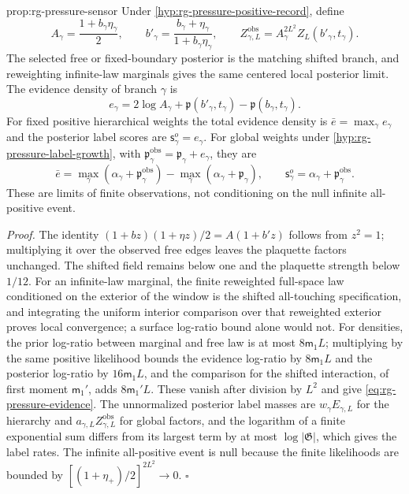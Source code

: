 {prop:rg-pressure-sensor}
Under \cref{hyp:rg-pressure-positive-record}, define
\begin{equation}
 A_\gamma=\frac{1+b_\gamma\eta_\gamma}{2},\qquad
 b'_\gamma=\frac{b_\gamma+\eta_\gamma}{1+b_\gamma\eta_\gamma},\qquad
 Z^{\mathrm{obs}}_{\gamma,L}
 =A_\gamma^{2L^2}Z_L(b'_\gamma,t_\gamma).
 \label{eq:rg-pressure-sensor}
\end{equation}
The selected free or fixed-boundary posterior is the matching shifted branch,
and reweighting infinite-law marginals gives the same centered local
posterior limit. The evidence density of branch $\gamma$ is
\begin{equation}
 e_\gamma=2\log A_\gamma+
 \mathfrak p(b'_\gamma,t_\gamma)-\mathfrak p(b_\gamma,t_\gamma).
 \label{eq:rg-pressure-evidence}
\end{equation}
For fixed positive hierarchical weights the total evidence density is
$\bar e=\max_\gamma e_\gamma$ and the posterior label scores are
$\mathsf s^o_\gamma=e_\gamma$. For global weights under
\cref{hyp:rg-pressure-label-growth}, with
$\mathfrak p^{\mathrm{obs}}_\gamma=\mathfrak p_\gamma+e_\gamma$, they are
\begin{equation}
 \bar e=\max_\gamma(\alpha_\gamma+\mathfrak p_\gamma^{\mathrm{obs}})
   -\max_\gamma(\alpha_\gamma+\mathfrak p_\gamma),\qquad
 \mathsf s^o_\gamma=\alpha_\gamma+\mathfrak p_\gamma^{\mathrm{obs}}.
 \label{eq:rg-pressure-evidence-global}
\end{equation}
These are limits of finite observations, not conditioning on the null
infinite all-positive event. 

\noindent\emph{Proof.}
The identity $(1+bz)(1+\eta z)/2=A(1+b'z)$ follows from $z^2=1$; multiplying
it over the observed free edges leaves the plaquette factors unchanged. The
shifted field remains below one and the plaquette strength below $1/12$. For
an infinite-law marginal, the finite reweighted full-space law conditioned on
the exterior of the window is the shifted all-touching specification, and
integrating the uniform interior comparison over that reweighted exterior
proves local convergence; a surface log-ratio bound alone would not. For
densities, the prior log-ratio between marginal and free law is at most
$8\mathsf m_1L$; multiplying by the same positive likelihood bounds the
evidence log-ratio by $8\mathsf m_1L$ and the posterior log-ratio by
$16\mathsf m_1L$, and the comparison for the shifted interaction, of first
moment $\mathsf m_1'$, adds $8\mathsf m_1'L$. These
vanish after division by $L^2$ and give \cref{eq:rg-pressure-evidence}. The
unnormalized posterior label masses are $w_\gamma E_{\gamma,L}$ for the
hierarchy and $a_{\gamma,L}Z^{\mathrm{obs}}_{\gamma,L}$ for global factors,
and the logarithm of a finite exponential sum differs from its largest term
by at most $\log|\mathfrak G|$, which gives the label rates. The infinite
all-positive event is null because the finite likelihoods are bounded by
$[(1+\eta_+)/2]^{2L^2}\to0$. $\square$

